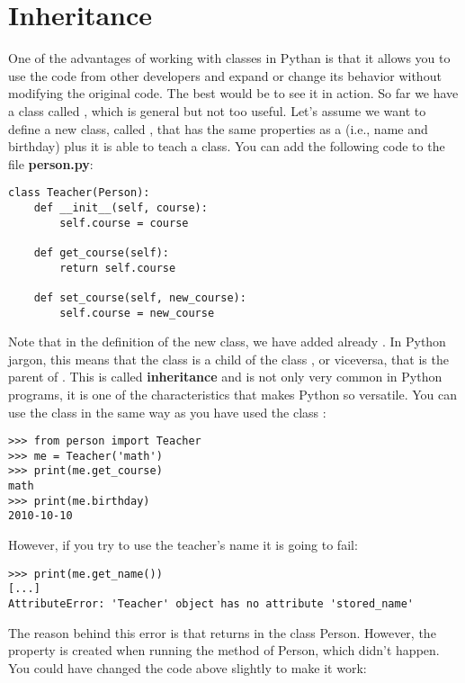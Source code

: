 \section{Inheritance}
One of the advantages of working with classes in Pythan is that it allows you to use the code from other developers and expand or change its behavior without modifying the original code. The best would be to see it in action. So far we have a class called , which is general but not too useful. Let's assume we want to define a new class, called , that has the same properties as a  (i.e., name and birthday) plus it is able to teach a class. You can add the following code to the file \textbf{person.py}:

\begin{verbatim}
class Teacher(Person):
    def __init__(self, course):
        self.course = course
        
    def get_course(self):
        return self.course
        
    def set_course(self, new_course):
        self.course = new_course
\end{verbatim}

Note that in the definition of the new  class, we have added already . In Python jargon, this means that the class  is a child of the class , or viceversa, that  is the parent of . This is called \textbf{inheritance} and is not only very common in Python programs, it is one of the characteristics that makes Python so versatile. You can use the class  in the same way as you have used the class :

\begin{verbatim}
>>> from person import Teacher
>>> me = Teacher('math')
>>> print(me.get_course)
math
>>> print(me.birthday)
2010-10-10
\end{verbatim}

However, if you try to use the teacher's name it is going to fail:

\begin{verbatim}
>>> print(me.get_name())
[...]
AttributeError: 'Teacher' object has no attribute 'stored_name'
\end{verbatim}

The reason behind this error is that  returns  in the class Person. However, the property  is created when running the  method of Person, which didn't happen. You could have changed the code above slightly to make it work: 

